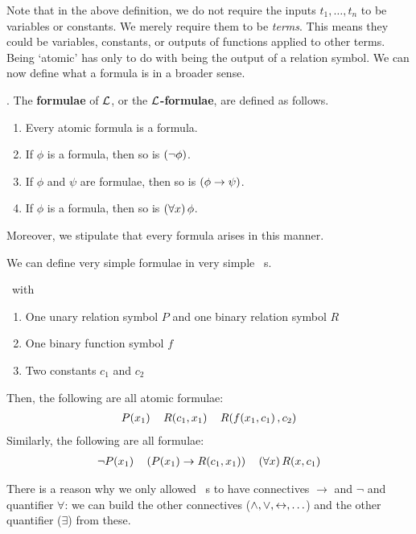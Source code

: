 Note that in the above definition, we do not require the inputs $t_1, \ldots, t_n$ to be variables or constants. We merely require them to be \textit{terms}. This means they could be variables, constants, or outputs of functions applied to other terms. Being `atomic' has only to do with being the output of a relation symbol. We can now define what a formula is in a broader sense.

\begin{boxdefinition}[Formula]
    \Letla. The \textbf{formulae} of $\mathcal{L}$, or the \textbf{$\mathcal{L}$-formulae}, are defined as follows.
    \begin{enumerate}
        \item Every atomic formula is a formula.
        \item If $\phi$ is a formula, then so is $\left( \neg \phi \right)$.
        \item If $\phi$ and $\psi$ are formulae, then so is $\left( \phi \to \psi \right)$.
        \item If $\phi$ is a formula, then so is $\left( \forall x \right) \phi$.
    \end{enumerate}
    Moreover, we stipulate that every formula arises in this manner.
\end{boxdefinition}

We can define very simple formulae in very simple \fola~s.

\begin{boxexample}
    \Letla\ with
    \begin{enumerate}
        \item One unary relation symbol $P$ and one binary relation symbol $R$
        \item One binary function symbol $f$
        \item Two constants $c_1$ and $c_2$
    \end{enumerate}
    Then, the following are all atomic formulae:
    \begin{align*}
        P\!\left( x_1 \right) \quad R\!\left( c_1, x_1 \right) \quad R\!\left( f\!\left( x_1, c_1 \right), c_2 \right)
    \end{align*}
    Similarly, the following are all formulae:
    \begin{align*}
        \neg P\!\left( x_1 \right) \quad \left( P\!\left( x_1 \right) \to R\!\left( c_1, x_1 \right) \right) \quad \left( \forall x \right) R\!\left( x, c_1 \right)
    \end{align*}
\end{boxexample}

There is a reason why we only allowed \fola~s to have connectives $\to$ and $\neg$ and quantifier $\forall$: we can build the other connectives ($\land, \lor, \leftrightarrow, \ldots$) and the other quantifier ($\exists$) from these.

